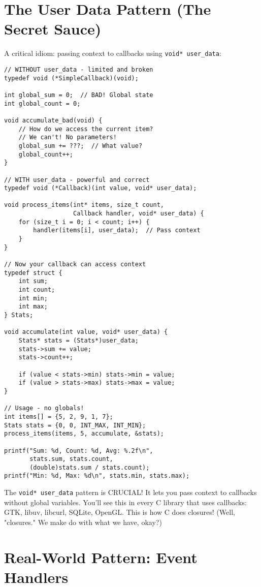 \section{The User Data Pattern (The Secret Sauce)}

A critical idiom: passing context to callbacks using \texttt{void* user\_data}:

\begin{lstlisting}
// WITHOUT user_data - limited and broken
typedef void (*SimpleCallback)(void);

int global_sum = 0;  // BAD! Global state
int global_count = 0;

void accumulate_bad(void) {
    // How do we access the current item?
    // We can't! No parameters!
    global_sum += ???;  // What value?
    global_count++;
}

// WITH user_data - powerful and correct
typedef void (*Callback)(int value, void* user_data);

void process_items(int* items, size_t count,
                   Callback handler, void* user_data) {
    for (size_t i = 0; i < count; i++) {
        handler(items[i], user_data);  // Pass context
    }
}

// Now your callback can access context
typedef struct {
    int sum;
    int count;
    int min;
    int max;
} Stats;

void accumulate(int value, void* user_data) {
    Stats* stats = (Stats*)user_data;
    stats->sum += value;
    stats->count++;

    if (value < stats->min) stats->min = value;
    if (value > stats->max) stats->max = value;
}

// Usage - no globals!
int items[] = {5, 2, 9, 1, 7};
Stats stats = {0, 0, INT_MAX, INT_MIN};
process_items(items, 5, accumulate, &stats);

printf("Sum: %d, Count: %d, Avg: %.2f\n",
       stats.sum, stats.count,
       (double)stats.sum / stats.count);
printf("Min: %d, Max: %d\n", stats.min, stats.max);
\end{lstlisting}

\begin{tipbox}
The \texttt{void* user\_data} pattern is CRUCIAL! It lets you pass context to callbacks without global variables. You'll see this in every C library that uses callbacks: GTK, libuv, libcurl, SQLite, OpenGL. This is how C does closures! (Well, "closures." We make do with what we have, okay?)
\end{tipbox}

\section{Real-World Pattern: Event Handlers}

